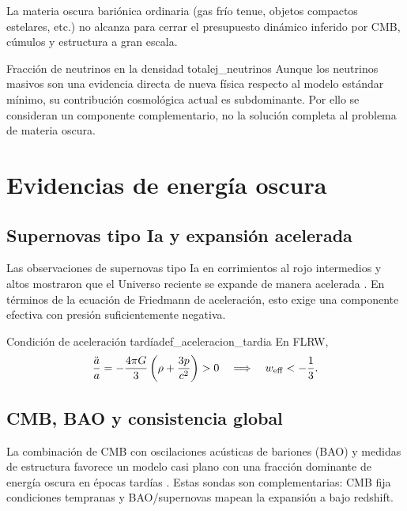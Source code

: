 \begin{importante}
La materia oscura bariónica ordinaria (gas frío tenue, objetos compactos estelares, etc.) no alcanza para cerrar el presupuesto dinámico inferido por CMB, cúmulos y estructura a gran escala.
\end{importante}

\begin{ejemplo}{Fracción de neutrinos en la densidad total}{ej_neutrinos}
Aunque los neutrinos masivos son una evidencia directa de nueva física respecto al modelo estándar mínimo, su contribución cosmológica actual es subdominante. Por ello se consideran un componente complementario, no la solución completa al problema de materia oscura.
\end{ejemplo}

\section{Evidencias de energía oscura}
\label{sec:evidencias_de}

\subsection{Supernovas tipo Ia y expansión acelerada}

Las observaciones de supernovas tipo Ia en corrimientos al rojo intermedios y altos mostraron que el Universo reciente se expande de manera acelerada \cite{Riess1998, Perlmutter1999}. En términos de la ecuación de Friedmann de aceleración, esto exige una componente efectiva con presión suficientemente negativa.

\begin{definicion}{Condición de aceleración tardía}{def_aceleracion_tardia}
En FLRW,
\begin{equation}
  \frac{\ddot a}{a}=-\frac{4\pi G}{3}\left(\rho+\frac{3p}{c^2}\right)>0
  \quad\Longrightarrow\quad
  w_{\rm eff}<-\frac{1}{3}.
\end{equation}
\end{definicion}

\subsection{CMB, BAO y consistencia global}

La combinación de CMB con oscilaciones acústicas de bariones (BAO) y medidas de estructura favorece un modelo casi plano con una fracción dominante de energía oscura en épocas tardías \cite{Planck2020}. Estas sondas son complementarias: CMB fija condiciones tempranas y BAO/supernovas mapean la expansión a bajo redshift.

